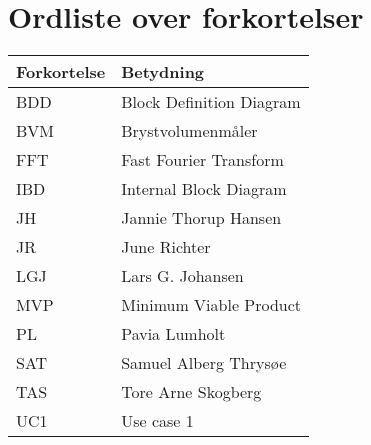 \section*{Ordliste over forkortelser}

\vspace{1cm}
\begin{table}[hbt]
\centering
\label{ordliste}
\begin{tabular}{|l|l|}
\hline
\textbf{Forkortelse             } & \textbf{Betydning             } \\ \hline
BDD & Block Definition Diagram \\ \hline
BVM & Brystvolumenmåler \\ \hline
FFT & Fast Fourier Transform \\ \hline
IBD & Internal Block Diagram \\ \hline 
JH & Jannie Thorup Hansen \\ \hline
JR & June Richter  \\ \hline
LGJ & Lars G. Johansen \\ \hline 
MVP & Minimum Viable Product \\ \hline
PL & Pavia Lumholt \\ \hline
SAT & Samuel Alberg Thrysøe \\ \hline
TAS & Tore Arne Skogberg \\ \hline
UC1 & Use case 1 \\ \hline
\end{tabular}
\end{table}
